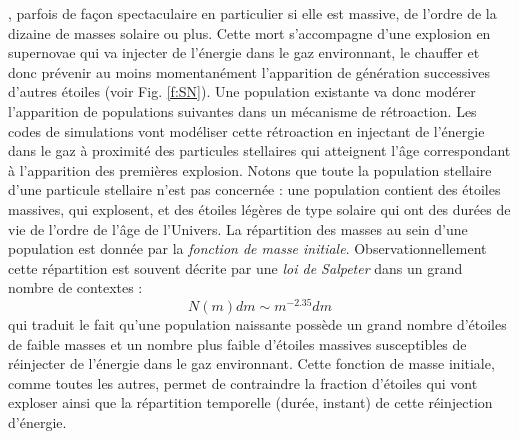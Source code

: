 , parfois de façon spectaculaire en particulier si elle est massive, de l'ordre de la dizaine de masses solaire ou plus. Cette mort s'accompagne d'une explosion en supernovae qui va injecter de l'énergie dans le gaz environnant, le chauffer et donc prévenir au moins momentanément l'apparition de génération successives d'autres étoiles (voir Fig. \ref{f:SN}). Une population existante va donc modérer l'apparition de populations suivantes dans un mécanisme de rétroaction. Les codes de simulations vont modéliser cette rétroaction en injectant de l'énergie dans le gaz à proximité des particules stellaires qui atteignent l'âge correspondant à l'apparition des premières explosion. Notons que toute la population stellaire d'une particule stellaire n'est pas concernée : une population contient des étoiles massives, qui explosent, et des étoiles légères de type solaire qui ont des durées de vie de l'ordre de l'âge de l'Univers. La répartition des masses au sein d'une population est donnée par la \textit{fonction de masse initiale}. Observationnellement cette répartition est souvent décrite par une \textit{loi de Salpeter} dans un grand nombre de contextes :
\begin{equation}
N(m)dm\sim m^{-2.35}dm
\end{equation}
qui traduit le fait qu'une population naissante possède un grand nombre d'étoiles de faible masses et un nombre plus faible d'étoiles massives susceptibles de réinjecter de l'énergie dans le gaz environnant. Cette fonction de masse initiale, comme toutes les autres, permet de contraindre la fraction d'étoiles qui vont exploser ainsi que la répartition temporelle (durée, instant) de cette réinjection d'énergie.

